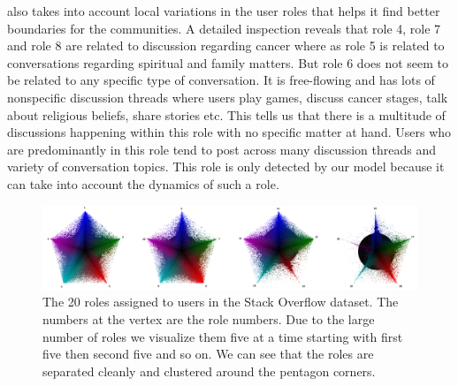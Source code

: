 \documentclass{sig-alternate}
\newcommand{\abhi}[1]{\textcolor{blue}{\\ abhi-comment: #1}}
\begin{document}
also takes into account local variations
in the user roles that helps it find better boundaries for the communities.
A detailed inspection reveals that role 4, role 7 and role 8 are
related to discussion regarding cancer where as role 5 is related to
conversations regarding spiritual and family matters.  But role 6 does not seem
to be related to any specific type of conversation. It is free-flowing and has
lots of nonspecific discussion threads where users play games,
discuss cancer stages, talk about religious beliefs, share stories etc. 
This tells us that there is a multitude of
discussions happening within this role with no specific matter at hand. 
Users who are
predominantly in this role tend to post across many discussion threads and
variety of conversation topics. This role is only detected by our model 
because it can take into account the dynamics of such a role.

\begin{figure}
\centering
  \includegraphics[width=1\linewidth]{piSOAnnotated.png}
\vspace*{-2\baselineskip}
\caption{\small{The 20 roles assigned to users in the Stack Overflow
dataset. The numbers at the vertex are the role numbers. Due to the large
number of roles we visualize them five at a time starting 
with first five then second five and so on.
We can see that the roles are separated cleanly and clustered around the
pentagon corners.}}
\label{fig:SOclusters}
\vspace*{-1\baselineskip}
\end{figure}
\end{document}
